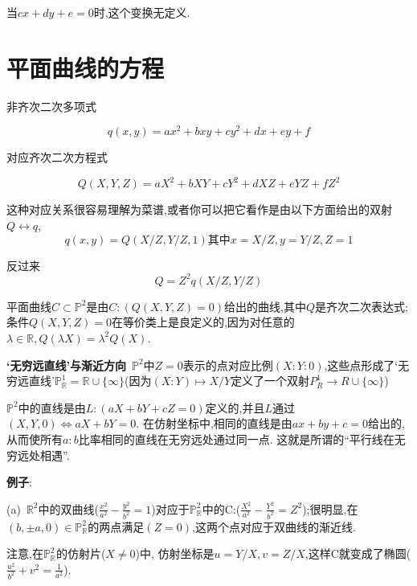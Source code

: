 \documentclass[UTF8]{book}
\begin{document}
		当$ cx+dy+e=0 $时,这个变换无定义.
	\section{平面曲线的方程}
		非齐次二次多项式
		
		\begin{equation*}
				q(x,y)=ax^{2}+bxy+cy^{2}+dx+ey+f
		\end{equation*}
	
		对应齐次二次方程式
		
		\begin{equation*}
			Q(X,Y,Z)=aX^{2}+bXY+cY^{2}+dXZ+eYZ+fZ^{2}
		\end{equation*}
		
		这种对应关系很容易理解为菜谱,或者你可以把它看作是由以下方面给出的双射$Q  \longleftrightarrow q$,
		\begin{equation*}
			q(x,y)=Q(X/Z,Y/Z,1) \text{其中} x=X/Z,y=Y/Z,Z=1
		\end{equation*}
	
	
		反过来
		\begin{equation*}
			Q=Z^{2}q(X/Z,Y/Z)
		\end{equation*}
	
		平面曲线$C\subset \mathbb{P}^{2}$是由$ C:(Q(X,Y,Z)=0) $给出的曲线,其中$ Q $是齐次二次表达式;条件$ Q(X,Y,Z)=0 $在等价类上是良定义的,因为对任意的$\lambda \in \mathbb{R}, Q(\lambda X)=\lambda^{2}Q(X)$.
		
		
		\textbf{‘无穷远直线’与渐近方向}\ 
		$\mathbb{P}^{2}$中$ Z=0 $表示的点对应比例$ (X:Y:0) $,这些点形成了‘无穷远直线’$\mathbb{P}^{1}_{\mathbb{R}}=\mathbb{R} \cup \{ \infty \}$(因为$(X:Y)\mapsto X/Y$定义了一个双射$P^{1}_{R} \rightarrow R \cup \{ \infty \}$)
		
		
		 $\mathbb{P}^{2}$中的直线是由$ L:(aX+bY+cZ=0) $定义的,并且$ L $通过$(X,Y,0)\Longleftrightarrow aX+bY=0$. 在仿射坐标中,相同的直线是由$ ax+by+c=0 $给出的,从而使所有$a : b$比率相同的直线在无穷远处通过同一点. 这就是所谓的“平行线在无穷远处相遇”.
		
		
		\textbf{例子}:
		
		
		(a)\ $\mathbb{R}^{2}$中的双曲线($\frac{x^{2}}{a^{2}}-\frac{y^{2}}{b^{2}}=1$)对应于$\mathbb{P}^{2}_{\mathbb{R}}$中的C:($\frac{X^{2}}{a^{2}}-\frac{Y^{2}}{b^{2}}=Z^{2}$);很明显,在$(b,±a,0)\in \mathbb{P}^{2}_{\mathbb{R}}$的两点满足$ (Z=0) $,这两个点对应于双曲线的渐近线.
		
		
		注意,在$\mathbb{P}^{2}_{\mathbb{R}}$的仿射片($X\neq 0$)中, 仿射坐标是$ u=Y/X,v=Z/X $,这样C就变成了椭圆($\frac{u^{2}}{b^{2}}+v^{2}=\frac{1}{a^{2}}$).
		
\end{document}
